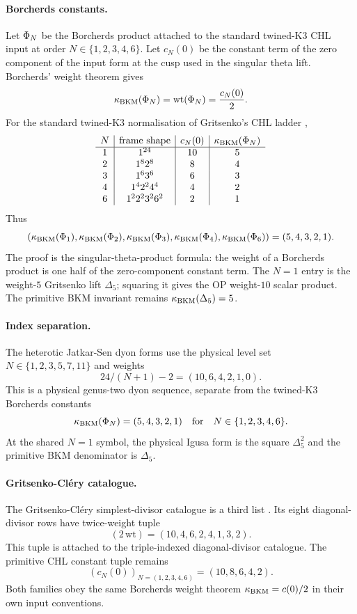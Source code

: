\paragraph{Borcherds constants.}
Let $\Phi_N$ be the Borcherds product attached to the standard
twined-K3 CHL input at order $N\in\{1,2,3,4,6\}$.  Let $c_N(0)$ be the
constant term of the zero component of the input form at the cusp used
in the singular theta lift.  Borcherds' weight theorem
\cite{Borcherds1998} gives
\[
  \kappa_{\mathrm{BKM}}(\Phi_N)=\mathrm{wt}(\Phi_N)=\frac{c_N(0)}{2}.
\]
For the standard twined-K3 normalisation of Gritsenko's CHL ladder
\cite{Gritsenko1999},
\[
\begin{array}{c|c|c|c}
N & \text{frame shape} & c_N(0) & \kappa_{\mathrm{BKM}}(\Phi_N)\\
\hline
1 & 1^{24} & 10 & 5\\
2 & 1^8 2^8 & 8 & 4\\
3 & 1^6 3^6 & 6 & 3\\
4 & 1^4 2^2 4^4 & 4 & 2\\
6 & 1^2 2^2 3^2 6^2 & 2 & 1
\end{array}
\]
Thus
\[
  (\kappa_{\mathrm{BKM}}(\Phi_1),\kappa_{\mathrm{BKM}}(\Phi_2),\kappa_{\mathrm{BKM}}(\Phi_3),
    \kappa_{\mathrm{BKM}}(\Phi_4),\kappa_{\mathrm{BKM}}(\Phi_6))=(5,4,3,2,1).
\]
The proof is the singular-theta-product formula: the weight of a
Borcherds product is one half of the zero-component constant term.
The $N=1$ entry is the weight-$5$ Gritsenko lift $\Delta_5$; squaring
it gives the OP weight-$10$ scalar product.  The primitive BKM
invariant remains $\kappa_{\mathrm{BKM}}(\Delta_5)=5$.

\paragraph{Index separation.}
The heterotic Jatkar-Sen dyon forms use the physical level set
$N\in\{1,2,3,5,7,11\}$ and weights
\[
  24/(N+1)-2=(10,6,4,2,1,0).
\]
This is a physical genus-two dyon sequence, separate from the
twined-K3 Borcherds constants
\[
  \kappa_{\mathrm{BKM}}(\Phi_N)=(5,4,3,2,1)
  \quad\text{for}\quad N\in\{1,2,3,4,6\}.
\]
At the shared $N=1$ symbol, the physical Igusa form is the square
$\Delta_5^2$ and the primitive BKM denominator is $\Delta_5$.

\paragraph{Gritsenko-Cl\'ery catalogue.}
The Gritsenko-Cl\'ery simplest-divisor catalogue is a third list
\cite{GritsenkoClery2013}.  Its eight diagonal-divisor rows have
twice-weight tuple
\[
  (2\,\mathrm{wt})=(10,4,6,2,4,1,3,2).
\]
This tuple is attached to the triple-indexed diagonal-divisor
catalogue.  The primitive CHL constant tuple remains
\[
  (c_N(0))_{N=(1,2,3,4,6)}=(10,8,6,4,2).
\]
Both families obey the same Borcherds weight theorem
$\kappa_{\mathrm{BKM}}=c(0)/2$ in their own input conventions.

